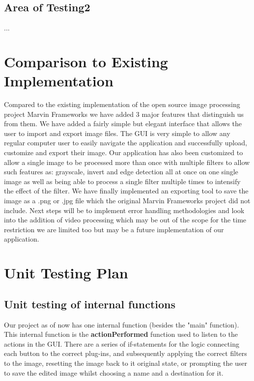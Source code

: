 \documentclass[12pt, titlepage]{article}
\begin{document}
\subsection{Area of Testing2}

...

	
\section{Comparison to Existing Implementation}	
			Compared to the existing implementation of the open source image processing project Marvin Frameworks we have added 3 major features that distinguish us from them. We have added a fairly simple but elegant interface that allows the user to import and export image files. The GUI is very simple to allow any regular computer user to easily navigate the application and successfully upload, customize and export their image.  Our application has also been customized to allow a single image to be processed more than once with multiple filters to allow such features as: grayscale, invert and edge detection all at once on one single image as well as being able to process a single filter multiple times to intensify the effect of the filter. We have finally implemented an exporting tool to save the image as a .png or .jpg file which the original Marvin Frameworks project did not include. Next steps will be to implement error handling methodologies and look into the addition of video processing which may be out of the scope for the time restriction we are limited too but may be a future implementation of our application.
\section{Unit Testing Plan}
		
\subsection{Unit testing of internal functions}

Our project as of now has one internal function (besides the "main" function).
This internal function is the \textbf{actionPerformed} function used to listen to the actions in the GUI. There are a series of if-statements for the logic connecting each button to the correct plug-ins, and subsequently applying the correct filters to the image, resetting the image back to it original state, or prompting the user to save the edited image whilst choosing a name and a destination for it.
\end{document}
